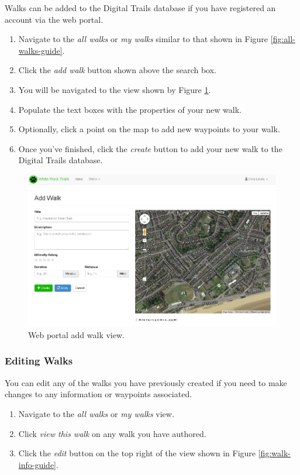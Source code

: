 \documentclass[11pt,a4paper]{report}
\begin{document}
Walks can be added to the Digital Trails database if you have registered an account via the web portal.

\begin{enumerate}
\item Navigate to the \emph{all walks} or \emph{my walks} similar to that shown in Figure \ref{fig:all-walks-guide}.
\item Click the \emph{add walk} button shown above the search box.
\item You will be navigated to the view shown by Figure \ref{fig:add-walk-guide}.
\item Populate the text boxes with the properties of your new walk.
\item Optionally, click a point on the map to add new waypoints to your walk.
\item Once you've finished, click the \emph{create} button to add your new walk to the Digital Trails database.
\end{enumerate}

\begin{figure}[H]
\centering
\includegraphics[width=0.8\linewidth]{./img/webportal/add-walk}
\caption{Web portal add walk view.}
\label{fig:add-walk-guide}
\end{figure}

\subsubsection{Editing Walks}

You can edit any of the walks you have previously created if you need to make changes to any information or waypoints associated.

\begin{enumerate}
\item Navigate to the \emph{all walks} or \emph{my walks} view.
\item Click \emph{view this walk} on any walk you have authored.
\item Click the \emph{edit} button on the top right of the view shown in Figure \ref{fig:walk-info-guide}.
\end{enumerate}
\end{document}
